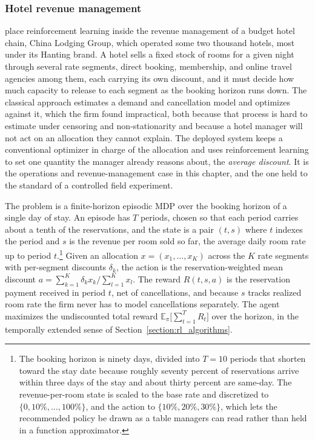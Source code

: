 \subsubsection{Hotel revenue management}
\label{sec:hotel}
\citet{Chen2023hotelrl} place reinforcement learning inside the revenue management of a budget hotel chain, China Lodging Group, which operated some two thousand hotels, most under its Hanting brand. A hotel sells a fixed stock of rooms for a given night through several rate segments, direct booking, membership, and online travel agencies among them, each carrying its own discount, and it must decide how much capacity to release to each segment as the booking horizon runs down. The classical approach estimates a demand and cancellation model and optimizes against it, which the firm found impractical, both because that process is hard to estimate under censoring and non-stationarity and because a hotel manager will not act on an allocation they cannot explain. The deployed system keeps a conventional optimizer in charge of the allocation and uses reinforcement learning to set one quantity the manager already reasons about, the \emph{average discount}. It is the operations and revenue-management case in this chapter, and the one held to the standard of a controlled field experiment.

The problem is a finite-horizon episodic MDP over the booking horizon of a single day of stay. An episode has $T$ periods, chosen so that each period carries about a tenth of the reservations, and the state is a pair $(t,s)$ where $t$ indexes the period and $s$ is the revenue per room sold so far, the average daily room rate up to period $t$.\footnote{The booking horizon is ninety days, divided into $T=10$ periods that shorten toward the stay date because roughly seventy percent of reservations arrive within three days of the stay and about thirty percent are same-day. The revenue-per-room state is scaled to the base rate and discretized to $\{0,10\%,\dots,100\%\}$, and the action to $\{10\%,20\%,30\%\}$, which lets the recommended policy be drawn as a table managers can read rather than held in a function approximator.} Given an allocation $x=(x_1,\dots,x_K)$ across the $K$ rate segments with per-segment discounts $\delta_k$, the action is the reservation-weighted mean discount $a=\sum_{k=1}^{K}\delta_k x_k/\sum_{l=1}^{K}x_l$. The reward $R(t,s,a)$ is the reservation payment received in period $t$, net of cancellations, and because $s$ tracks realized room rate the firm never has to model cancellations separately. The agent maximizes the undiscounted total reward $\mathbb{E}_\pi\big[\sum_{t=1}^{T} R_t\big]$ over the horizon, in the temporally extended sense of Section~\ref{section:rl_algorithms}.

